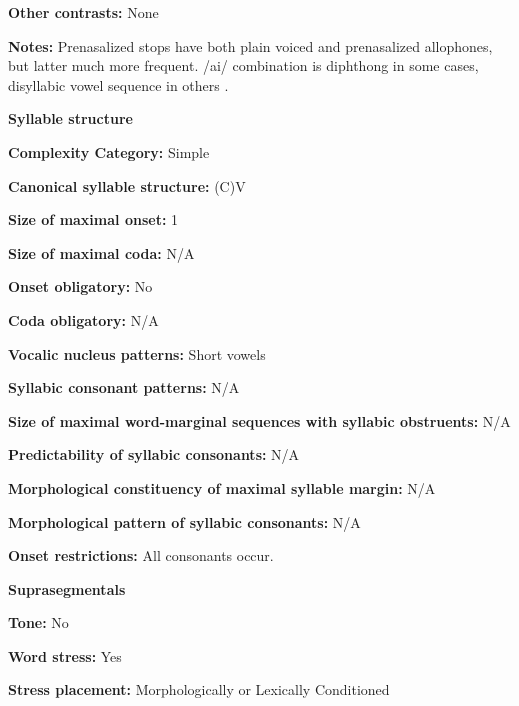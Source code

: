 \textbf{Other contrasts:} None



\textbf{Notes:} Prenasalized stops have both plain voiced and prenasalized allophones, but latter much more frequent. /ai/ combination is diphthong in some cases, disyllabic vowel sequence in others \citep[22]{Wegener2008}.



\textbf{Syllable structure}



\textbf{Complexity Category:} Simple



\textbf{Canonical syllable structure:} (C)V \citep[23-4]{Wegener2008}



\textbf{Size of maximal onset:} 1



\textbf{Size of maximal coda:} N/A



\textbf{Onset obligatory:} No



\textbf{Coda obligatory:} N/A



\textbf{Vocalic nucleus patterns:} Short vowels



\textbf{Syllabic consonant patterns:} N/A



\textbf{Size of maximal word{}-marginal sequences with syllabic obstruents:} N/A



\textbf{Predictability of syllabic consonants:} N/A



\textbf{Morphological constituency of maximal syllable margin:} N/A



\textbf{Morphological pattern of syllabic consonants:} N/A



\textbf{Onset restrictions:} All consonants occur.



\textbf{Suprasegmentals}



\textbf{Tone:} No



\textbf{Word stress:} Yes



\textbf{Stress placement:} Morphologically or Lexically Conditioned



